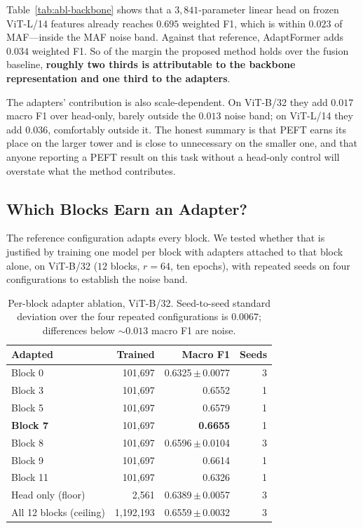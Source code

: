 \documentclass[conference]{IEEEtran}
\begin{document}
Table~\ref{tab:abl-backbone} shows that a $3{,}841$-parameter linear head on
frozen ViT-L/14 features already reaches $0.695$ weighted F1, which is within
$0.023$ of MAF---inside the MAF noise band. Against that reference, AdaptFormer
adds $0.034$ weighted F1. So of the margin the proposed method holds over the
fusion baseline, \textbf{roughly two thirds is attributable to the backbone
representation and one third to the adapters}.

The adapters' contribution is also scale-dependent. On ViT-B/32 they add $0.017$
macro F1 over head-only, barely outside the $0.013$ noise band; on ViT-L/14 they
add $0.036$, comfortably outside it. The honest summary is that PEFT earns its
place on the larger tower and is close to unnecessary on the smaller one, and
that anyone reporting a PEFT result on this task without a head-only control
will overstate what the method contributes.

\subsection{Which Blocks Earn an Adapter?}
\label{sec:abl-block}

The reference configuration adapts every block. We tested whether that is
justified by training one model per block with adapters attached to that block
alone, on ViT-B/32 ($12$ blocks, $r=64$, ten epochs), with repeated seeds on
four configurations to establish the noise band.

\begin{table}[t]
\caption{Per-block adapter ablation, ViT-B/32. Seed-to-seed standard deviation
over the four repeated configurations is $0.0067$; differences below
$\sim$$0.013$ macro F1 are noise.}
\label{tab:abl-block}
\centering
\footnotesize
\begin{tabular}{lrrr}
\toprule
Adapted & Trained & Macro F1 & Seeds \\
\midrule
Block 0  & 101{,}697 & 0.6325\,$\pm$\,0.0077 & 3 \\
Block 3  & 101{,}697 & 0.6552 & 1 \\
Block 5  & 101{,}697 & 0.6579 & 1 \\
\textbf{Block 7} & 101{,}697 & \textbf{0.6655} & 1 \\
Block 8  & 101{,}697 & 0.6596\,$\pm$\,0.0104 & 3 \\
Block 9  & 101{,}697 & 0.6614 & 1 \\
Block 11 & 101{,}697 & 0.6326 & 1 \\
\midrule
Head only (floor)      & 2{,}561     & 0.6389\,$\pm$\,0.0057 & 3 \\
All 12 blocks (ceiling)& 1{,}192{,}193 & 0.6559\,$\pm$\,0.0032 & 3 \\
\bottomrule
\end{tabular}
\end{table}
\end{document}
